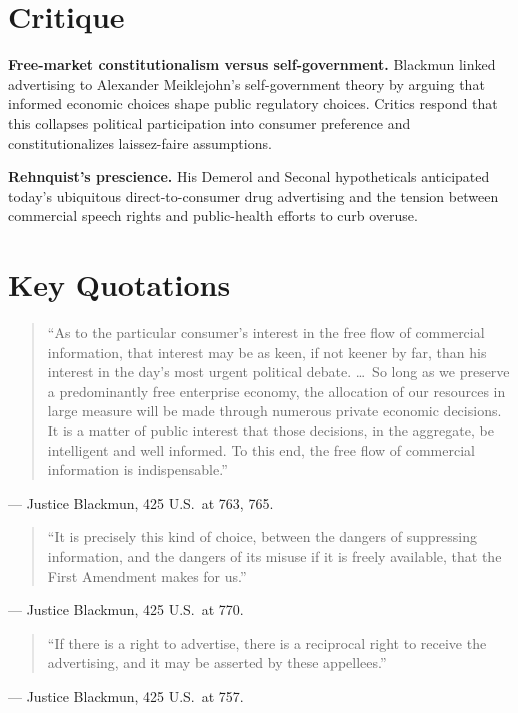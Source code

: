 \documentclass[12pt]{article}
\begin{document}
\section{Critique}

\textbf{Free-market constitutionalism versus self-government.} Blackmun linked advertising to Alexander Meiklejohn's self-government theory by arguing that informed economic choices shape public regulatory choices. Critics respond that this collapses political participation into consumer preference and constitutionalizes laissez-faire assumptions.

\textbf{Rehnquist's prescience.} His Demerol and Seconal hypotheticals anticipated today's ubiquitous direct-to-consumer drug advertising and the tension between commercial speech rights and public-health efforts to curb overuse.

\section{Key Quotations}

\begin{quote}
``As to the particular consumer's interest in the free flow of commercial information, that interest may be as keen, if not keener by far, than his interest in the day's most urgent political debate. \dots\ So long as we preserve a predominantly free enterprise economy, the allocation of our resources in large measure will be made through numerous private economic decisions. It is a matter of public interest that those decisions, in the aggregate, be intelligent and well informed. To this end, the free flow of commercial information is indispensable.''
\end{quote}
\noindent --- Justice Blackmun, 425 U.S.\ at 763, 765.

\begin{quote}
``It is precisely this kind of choice, between the dangers of suppressing information, and the dangers of its misuse if it is freely available, that the First Amendment makes for us.''
\end{quote}
\noindent --- Justice Blackmun, 425 U.S.\ at 770.

\begin{quote}
``If there is a right to advertise, there is a reciprocal right to receive the advertising, and it may be asserted by these appellees.''
\end{quote}
\noindent --- Justice Blackmun, 425 U.S.\ at 757.
\end{document}
